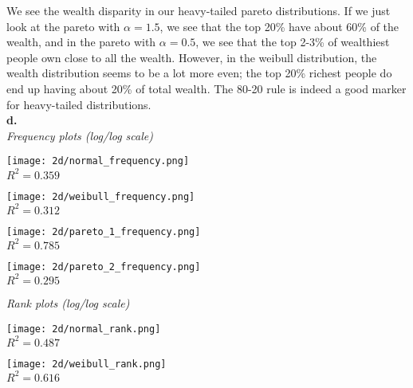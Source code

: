 \documentclass[12 pt]{article}
\begin{document}
	\noindent We see the wealth disparity in our heavy-tailed pareto distributions. If we just look at the pareto with $\alpha = 1.5$, we see that the top 20\% have about 60\% of the wealth, and in the pareto with $\alpha = 0.5$, we see that the top 2-3\% of wealthiest people own close to all the wealth. However, in the weibull distribution, the wealth distribution seems to be a lot more even; the top 20\% richest people do end up having about 20\% of total wealth. The 80-20 rule is indeed a good marker for heavy-tailed distributions.\\
	
	\noindent \textbf {d.} \\
	
	\noindent \textit{Frequency plots (log/log scale)} 
	
	\begin{center}
		\texttt{[image: 2d/normal\_frequency.png]}\\
		$R^2 = 0.359$\\
	\end{center}
	
	\begin{center}
		\texttt{[image: 2d/weibull\_frequency.png]}\\
		$R^2 = 0.312$\\
	\end{center}
	
	\begin{center}
		\texttt{[image: 2d/pareto\_1\_frequency.png]}\\
		$R^2 = 0.785$\\
	\end{center}
	
	\begin{center}
		\texttt{[image: 2d/pareto\_2\_frequency.png]} \\
		$R^2 = 0.295$\\
	\end{center}
	
	\noindent \textit{Rank plots (log/log scale)}
	
	\begin{center}
		\texttt{[image: 2d/normal\_rank.png]}\\
		$R^2 = 0.487$\\
	\end{center}
	
	\begin{center}
		\texttt{[image: 2d/weibull\_rank.png]}\\
		$R^2 = 0.616$\\
	\end{center}
	
\end{document}
